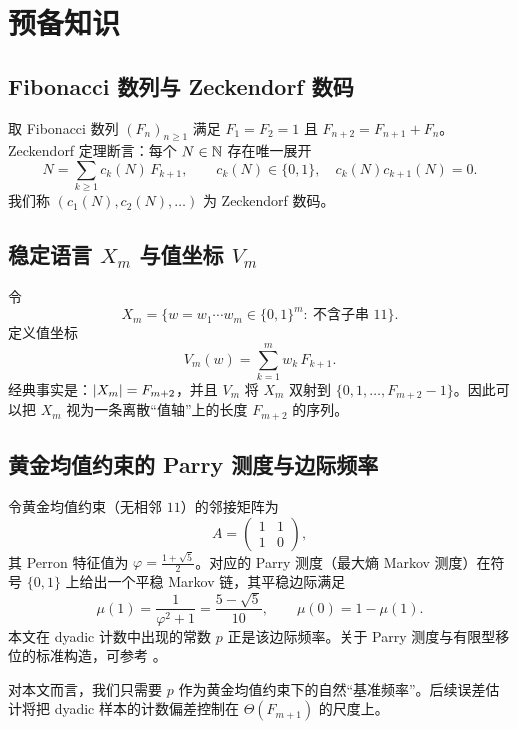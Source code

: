 
\section{预备知识}

\subsection{Fibonacci 数列与 Zeckendorf 数码}

取 Fibonacci 数列 $(F_n)_{n\ge 1}$ 满足 $F_1=F_2=1$ 且 $F_{n+2}=F_{n+1}+F_n$。Zeckendorf 定理断言：每个 $N\in\mathbb{N}$ 存在唯一展开
$$
N=\sum_{k\ge 1} c_k(N)\,F_{k+1},\qquad c_k(N)\in\{0,1\},\quad c_k(N)c_{k+1}(N)=0.
$$
我们称 $(c_1(N),c_2(N),\dots)$ 为 Zeckendorf 数码。

\subsection{稳定语言 \texorpdfstring{$X_m$}{X\_m} 与值坐标 \texorpdfstring{$V_m$}{V\_m}}

令
$$
X_m=\Big\{w=w_1\cdots w_m\in\{0,1\}^m:\ \text{不含子串 }11\Big\}.
$$
定义值坐标
$$
V_m(w)=\sum_{k=1}^{m} w_k\,F_{k+1}.
$$
经典事实是：$\left\lvert X_m\right\rvert=F_{m+2}$，并且 $V_m$ 将 $X_m$ 双射到 $\{0,1,\dots,F_{m+2}-1\}$。因此可以把 $X_m$ 视为一条离散“值轴”上的长度 $F_{m+2}$ 的序列。

\subsection{黄金均值约束的 Parry 测度与边际频率}

令黄金均值约束（无相邻 $11$）的邻接矩阵为
$$
A=\begin{pmatrix}1&1\\1&0\end{pmatrix},
$$
其 Perron 特征值为 $\varphi=\frac{1+\sqrt5}{2}$。对应的 Parry 测度（最大熵 Markov 测度）在符号 $\{0,1\}$ 上给出一个平稳 Markov 链，其平稳边际满足
$$
\mu(1)=\frac{1}{\varphi^2+1}=\frac{5-\sqrt5}{10},\qquad \mu(0)=1-\mu(1).
$$
本文在 dyadic 计数中出现的常数 $p$ 正是该边际频率。关于 Parry 测度与有限型移位的标准构造，可参考 \cite{lind1995symbolic}。

\begin{remark}
对本文而言，我们只需要 $p$ 作为黄金均值约束下的自然“基准频率”。后续误差估计将把 dyadic 样本的计数偏差控制在 $\Theta(F_{m+1})$ 的尺度上。
\end{remark}

